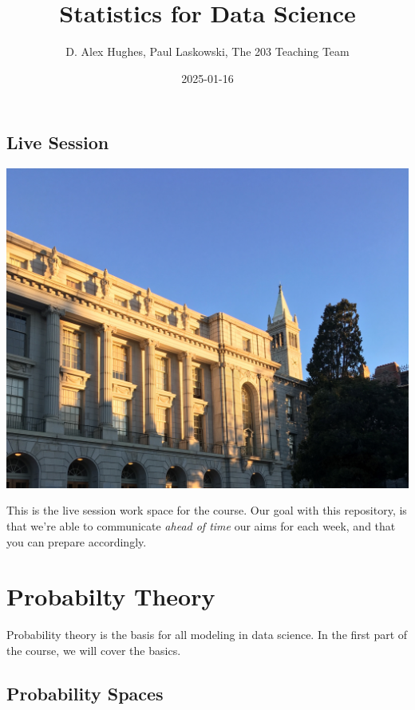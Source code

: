 \documentclass[
  letterpaper,
  DIV=11,
  numbers=noendperiod]{scrreprt}
\title{Statistics for Data Science}
\author{D. Alex Hughes, Paul Laskowski, The 203 Teaching Team}
\date{2025-01-16}
\renewcommand*\contentsname{Table of contents}
\newcommand\contentsname{Table of contents}
\begin{document}
\maketitle

\renewcommand*\contentsname{Table of contents}
{
\hypersetup{linkcolor=}
\setcounter{tocdepth}{2}
\tableofcontents
}

\chapter*{Live Session}\label{live-session}


\includegraphics{./images/campus.jpeg}

This is the live session work space for the course. Our goal with this
repository, is that we're able to communicate \emph{ahead of time} our
aims for each week, and that you can prepare accordingly.

\part{Probabilty Theory}

Probability theory is the basis for all modeling in data science. In the
first part of the course, we will cover the basics.

\chapter{Probability Spaces}\label{probability-spaces}
\end{document}
